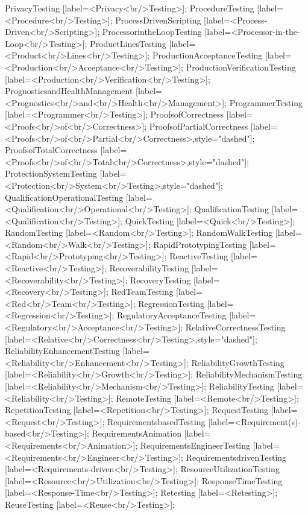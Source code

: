 \documentclass{article}
\begin{document}
{PrivacyTesting [label=<Privacy<br/>Testing>];
ProcedureTesting [label=<Procedure<br/>Testing>];
ProcessDrivenScripting [label=<Process-Driven<br/>Scripting>];
ProcessorintheLoopTesting [label=<Processor-in-the-Loop<br/>Testing>];
ProductLinesTesting [label=<Product<br/>Lines<br/>Testing>];
ProductionAcceptanceTesting [label=<Production<br/>Acceptance<br/>Testing>];
ProductionVerificationTesting [label=<Production<br/>Verification<br/>Testing>];
PrognosticsandHealthManagement [label=<Prognostics<br/>and<br/>Health<br/>Management>];
ProgrammerTesting [label=<Programmer<br/>Testing>];
ProofsofCorrectness [label=<Proofs<br/>of<br/>Correctness>];
ProofsofPartialCorrectness [label=<Proofs<br/>of<br/>Partial<br/>Correctness>,style="dashed"];
ProofsofTotalCorrectness [label=<Proofs<br/>of<br/>Total<br/>Correctness>,style="dashed"];
ProtectionSystemTesting [label=<Protection<br/>System<br/>Testing>,style="dashed"];
QualificationOperationalTesting [label=<Qualification<br/>Operational<br/>Testing>];
QualificationTesting [label=<Qualification<br/>Testing>];
QuickTesting [label=<Quick<br/>Testing>];
RandomTesting [label=<Random<br/>Testing>];
RandomWalkTesting [label=<Random<br/>Walk<br/>Testing>];
RapidPrototypingTesting [label=<Rapid<br/>Prototyping<br/>Testing>];
ReactiveTesting [label=<Reactive<br/>Testing>];
RecoverabilityTesting [label=<Recoverability<br/>Testing>];
RecoveryTesting [label=<Recovery<br/>Testing>];
RedTeamTesting [label=<Red<br/>Team<br/>Testing>];
RegressionTesting [label=<Regression<br/>Testing>];
RegulatoryAcceptanceTesting [label=<Regulatory<br/>Acceptance<br/>Testing>];
RelativeCorrectnessTesting [label=<Relative<br/>Correctness<br/>Testing>,style="dashed"];
ReliabilityEnhancementTesting [label=<Reliability<br/>Enhancement<br/>Testing>];
ReliabilityGrowthTesting [label=<Reliability<br/>Growth<br/>Testing>];
ReliabilityMechanismTesting [label=<Reliability<br/>Mechanism<br/>Testing>];
ReliabilityTesting [label=<Reliability<br/>Testing>];
RemoteTesting [label=<Remote<br/>Testing>];
RepetitionTesting [label=<Repetition<br/>Testing>];
RequestTesting [label=<Request<br/>Testing>];
RequirementsbasedTesting [label=<Requirement(s)-based<br/>Testing>];
RequirementsAnimation [label=<Requirements<br/>Animation>];
RequirementsEngineerTesting [label=<Requirements<br/>Engineer<br/>Testing>];
RequirementsdrivenTesting [label=<Requirements-driven<br/>Testing>];
ResourceUtilizationTesting [label=<Resource<br/>Utilization<br/>Testing>];
ResponseTimeTesting [label=<Response-Time<br/>Testing>];
Retesting [label=<Retesting>];
ReuseTesting [label=<Reuse<br/>Testing>];
}
\end{document}
